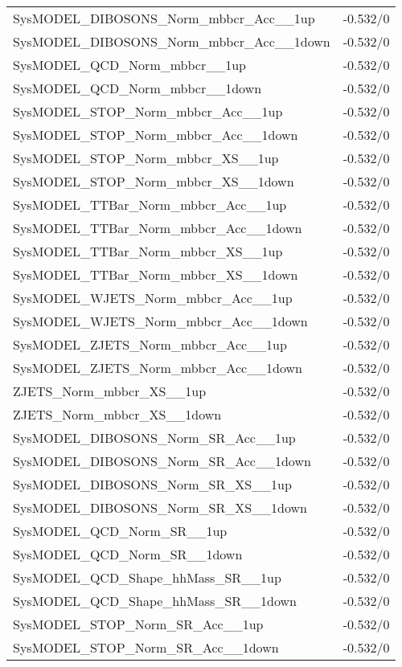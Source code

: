 \begin{longtable}{p{}|p{}}
SysMODEL\_DIBOSONS\_Norm\_mbbcr\_Acc\_\_1up & -0.532/0 \\
SysMODEL\_DIBOSONS\_Norm\_mbbcr\_Acc\_\_1down & -0.532/0 \\
SysMODEL\_QCD\_Norm\_mbbcr\_\_1up & -0.532/0 \\
SysMODEL\_QCD\_Norm\_mbbcr\_\_1down & -0.532/0 \\
SysMODEL\_STOP\_Norm\_mbbcr\_Acc\_\_1up & -0.532/0 \\
SysMODEL\_STOP\_Norm\_mbbcr\_Acc\_\_1down & -0.532/0 \\
SysMODEL\_STOP\_Norm\_mbbcr\_XS\_\_1up & -0.532/0 \\
SysMODEL\_STOP\_Norm\_mbbcr\_XS\_\_1down & -0.532/0 \\
SysMODEL\_TTBar\_Norm\_mbbcr\_Acc\_\_1up & -0.532/0 \\
SysMODEL\_TTBar\_Norm\_mbbcr\_Acc\_\_1down & -0.532/0 \\
SysMODEL\_TTBar\_Norm\_mbbcr\_XS\_\_1up & -0.532/0 \\
SysMODEL\_TTBar\_Norm\_mbbcr\_XS\_\_1down & -0.532/0 \\
SysMODEL\_WJETS\_Norm\_mbbcr\_Acc\_\_1up & -0.532/0 \\
SysMODEL\_WJETS\_Norm\_mbbcr\_Acc\_\_1down & -0.532/0 \\
SysMODEL\_ZJETS\_Norm\_mbbcr\_Acc\_\_1up & -0.532/0 \\
SysMODEL\_ZJETS\_Norm\_mbbcr\_Acc\_\_1down & -0.532/0 \\
ZJETS\_Norm\_mbbcr\_XS\_\_1up & -0.532/0 \\
ZJETS\_Norm\_mbbcr\_XS\_\_1down & -0.532/0 \\
SysMODEL\_DIBOSONS\_Norm\_SR\_Acc\_\_1up & -0.532/0 \\
SysMODEL\_DIBOSONS\_Norm\_SR\_Acc\_\_1down & -0.532/0 \\
SysMODEL\_DIBOSONS\_Norm\_SR\_XS\_\_1up & -0.532/0 \\
SysMODEL\_DIBOSONS\_Norm\_SR\_XS\_\_1down & -0.532/0 \\
SysMODEL\_QCD\_Norm\_SR\_\_1up & -0.532/0 \\
SysMODEL\_QCD\_Norm\_SR\_\_1down & -0.532/0 \\
SysMODEL\_QCD\_Shape\_hhMass\_SR\_\_1up & -0.532/0 \\
SysMODEL\_QCD\_Shape\_hhMass\_SR\_\_1down & -0.532/0 \\
SysMODEL\_STOP\_Norm\_SR\_Acc\_\_1up & -0.532/0 \\
SysMODEL\_STOP\_Norm\_SR\_Acc\_\_1down & -0.532/0 \\

\end{longtable}
